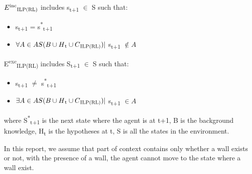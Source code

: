 \begin{defn} \label{def:ILPRL_inc}
$E\textsuperscript{inc}\textsubscript{ILP(RL)}$ includes s\textsubscript{t+1} $\in$ S such that:
\begin{itemize}
\item s\textsubscript{t+1} = s\textsuperscript{*}\textsubscript{t+1}
\item $ \forall A \in AS(B \cup H\textsubscript{t} \cup C\textsubscript{ILP(RL)})|$ s\textsubscript{t+1} $\not\in A$
\end{itemize}
\end{defn}

\begin{defn} \label{def:ILPRL_exc}
E\textsuperscript{exc}\textsubscript{ILP(RL)} includes S\textsubscript{t+1} $\in$ S such that:
\begin{itemize}
\item s\textsubscript{t+1} $\neq$ s\textsuperscript{*}\textsubscript{t+1}
\item $ \exists A \in AS(B \cup H\textsubscript{t} \cup C\textsubscript{ILP(RL)})|$ s\textsubscript{t+1} $\in A$
\end{itemize}
\end{defn}

where S\textsuperscript{*}\textsubscript{t+1} is the next state where the agent is at t+1, 
B is the background knowledge, H\textsubscript{t} is the hypotheses at t, 
S is all the states in the environment.


In this report, we assume that part of context contains only whether a wall exists or not, with the presence of a wall, the agent cannot move to the state where a wall exist.



